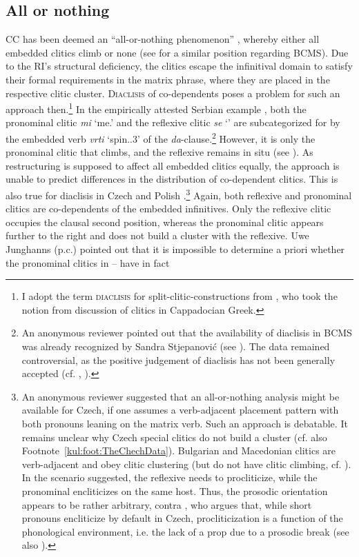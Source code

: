 \documentclass[output=paper,colorlinks,citecolor=brown]{langscibook}
\begin{document}
\subsection{All or nothing}\label{kul:sec:all-nothing}

CC has been deemed an “all-or-nothing phenomenon” \citep[111]{Rezac2005}, whereby either all embedded clitics climb or none (see \citealt[194]{Aljović2004} for a similar position regarding BCMS). Due to the RI’s structural deficiency, the clitics escape the infinitival domain to satisfy their formal requirements in the matrix phrase, where they are placed in the respective clitic cluster. \textsc{Diaclisis} of co-dependents poses a problem for such an approach then.\footnote{I adopt the term \textsc{diaclisis} for split-clitic-constructions from \citet[34]{KolakovicFritz2022}, who took the notion from  discussion of clitics in Cappadocian Greek.} In the empirically attested Serbian example , both the pronominal clitic \textit{mi} ‘me.{\DAT}’ and the reflexive clitic \textit{se} ‘{\REFL}’ are subcategorized for by the embedded verb \textit{vrti} ‘spin.{\PRS.3\SG}’ of the \textit{da}-clause.\footnote{An anonymous reviewer pointed out that the availability of diaclisis in BCMS was already recognized by Sandra Stjepanović (see \citealt{Stjepanovic1998, Stjepanovic1999, Stjepanovic2004}). The data remained controversial, as the positive judgement of diaclisis has not been generally accepted (cf. \citealt[192 Footnote~3]{Aljović2004}, \citealt[335]{FranksKing2000}).} However, it is only the pronominal clitic that climbs, and the reflexive remains in situ (see \citealt[307]{KolakovicFritz2022}). As restructuring is supposed to affect all embedded clitics equally, the approach is unable to predict differences in the distribution of co-dependent clitics. This is also true for diaclisis in Czech   and Polish .\footnote{An anonymous reviewer suggested that an all-or-nothing analysis might be available for Czech, if one assumes a verb-adjacent placement pattern with both pronouns leaning on the matrix verb. Such an approach is debatable. It remains unclear why Czech special clitics do not build a cluster (cf. also Footnote~\ref{kul:foot:TheChechData}). Bulgarian and Macedonian clitics are verb-adjacent and obey clitic clustering (but do not have clitic climbing, cf. \citealt[241]{FranksKing2000}). In the scenario suggested, the reflexive needs to procliticize, while the pronominal encliticizes on the same host. Thus, the prosodic orientation appears to be rather arbitrary, contra \citet{Toman1996}, who argues that, while short pronouns encliticize by default in Czech, procliticization is a function of the phonological environment, i.e. the lack of a prop due to a prosodic break (see also \citealt[178--179]{Junghanns2021}).} Again, both reflexive and pronominal clitics are co-dependents of the embedded infinitives. Only the reflexive clitic occupies the clausal second position, whereas the pronominal clitic appears further to the right and does not build a cluster with the reflexive. Uwe Junghanns (p.c.) pointed out that it is impossible to determine a priori whether the pronominal clitics in -- have in fact 
\end{document}
